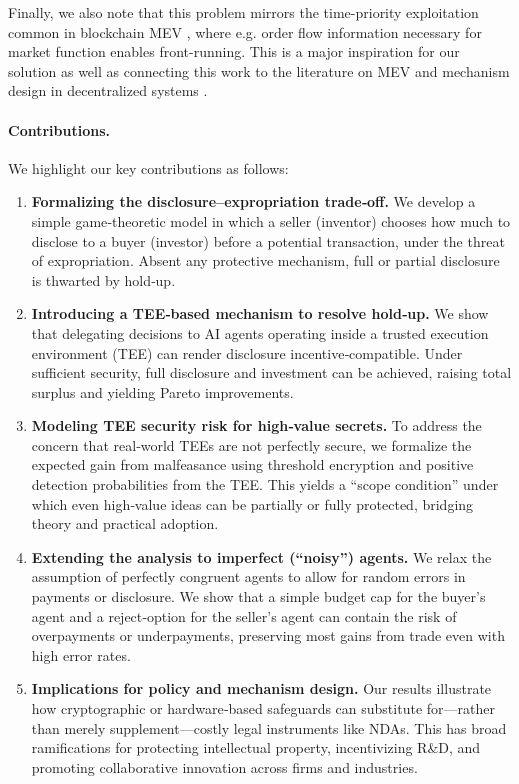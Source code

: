 Finally, we also note that this problem mirrors the time-priority exploitation common in blockchain MEV \citep{daian2020flash}, where e.g. order flow information necessary for market function enables front-running. This is a major inspiration for our solution as well as connecting this work to the literature on MEV and mechanism design in decentralized systems \citep{roughgarden2020transaction, capponi2023adoption}.

\paragraph{Contributions.}
We highlight our key contributions as follows:
\begin{enumerate}[noitemsep]
\item \textbf{Formalizing the disclosure–expropriation trade‐off.} We develop a simple game‐theoretic model in which a seller (inventor) chooses how much to disclose to a buyer (investor) before a potential transaction, under the threat of expropriation. Absent any protective mechanism, full or partial disclosure is thwarted by hold‐up.

\item \textbf{Introducing a TEE‐based mechanism to resolve hold‐up.} 
We show that delegating decisions to AI agents operating inside a trusted execution environment (TEE) can render disclosure incentive‐compatible. Under sufficient security, full disclosure and investment can be achieved, raising total surplus and yielding Pareto improvements.

\item \textbf{Modeling TEE security risk for high‐value secrets.}
To address the concern that real‐world TEEs are not perfectly secure, we formalize the expected gain from malfeasance using threshold encryption and positive detection probabilities from the TEE. This yields a “scope condition” under which even high‐value ideas can be partially or fully protected, bridging theory and practical adoption.

\item \textbf{Extending the analysis to imperfect (“noisy”) agents.} 
We relax the assumption of perfectly congruent agents to allow for random errors in payments or disclosure. We show that a simple budget cap for the buyer’s agent and a reject‐option for the seller’s agent can contain the risk of overpayments or underpayments, preserving most gains from trade even with high error rates.

\item \textbf{Implications for policy and mechanism design.} 
Our results illustrate how cryptographic or hardware‐based safeguards can substitute for—rather than merely supplement—costly legal instruments like NDAs. This has broad ramifications for protecting intellectual property, incentivizing R\&D, and promoting collaborative innovation across firms and industries.
\end{enumerate}